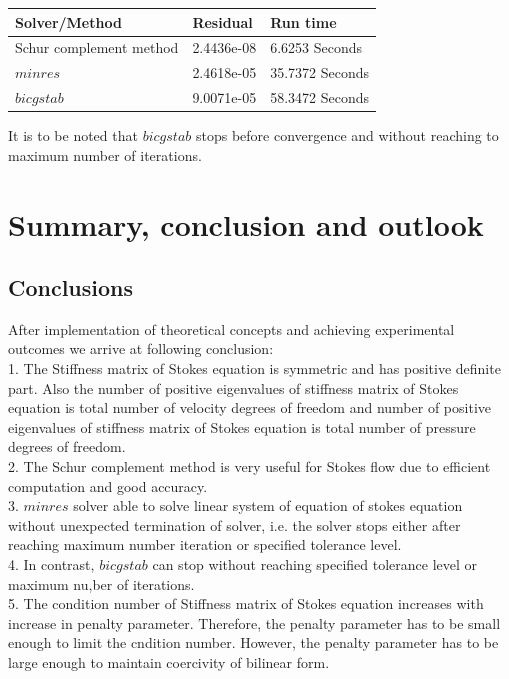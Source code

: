 \documentclass[a4paper]{book}
\begin{document}
\begin{longtable}{| p{} | p{} | p{} |}
\hline
\textbf{Solver/Method} & \textbf{Residual} & \textbf{Run time}\\
\hline
Schur complement method & 2.4436e-08 & 6.6253 Seconds\\
\hline
$minres$ & 2.4618e-05 & 35.7372 Seconds\\
\hline
$bicgstab$ & 9.0071e-05 & 58.3472 Seconds\\
\hline
\end{longtable}

It is to be noted that $bicgstab$ stops before convergence and without reaching to maximum number of iterations.

\chapter{Summary, conclusion and outlook}

\section{Conclusions}

After implementation of theoretical concepts and achieving experimental outcomes we arrive at following conclusion: \\

1. The Stiffness matrix of Stokes equation is symmetric and has positive definite part. Also the number of positive eigenvalues of stiffness matrix of Stokes equation is total number of velocity degrees of freedom and number of positive eigenvalues of stiffness matrix of Stokes equation is total number of pressure degrees of freedom.\\

2. The Schur complement method is very useful for Stokes flow due to efficient computation and good accuracy. \\

3. $minres$ solver able to solve linear system of equation of stokes equation without unexpected termination of solver, i.e. the solver stops either after reaching maximum number iteration or specified tolerance level.\\

4. In contrast, $bicgstab$ can stop without reaching specified tolerance level or maximum nu,ber of iterations.\\

5. The condition number of Stiffness matrix of Stokes equation increases with increase in penalty parameter. Therefore, the penalty parameter has to be small enough to limit the cndition number. However, the penalty parameter has to be large enough to maintain coercivity of bilinear form. \\
\end{document}
